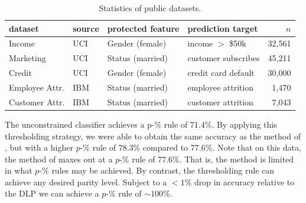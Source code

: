 \begin{table}
\centering
\caption{Statistics of public datasets.\label{tab:datastats}}
\footnotesize 
\begin{tabular}{llllr}
\toprule
\textbf{dataset} & \textbf{source} & \textbf{protected feature} & \textbf{prediction target} & $n$ \\
\midrule
Income & UCI \citep{uci_income} & Gender (female) & income $>$ \$50k & 32,561\\
Marketing & UCI \citep{uci_marketing} & Status (married) & customer subscribes & 45,211\\
Credit & UCI \citep{uci_default} & Gender (female) & credit card default & 30,000\\
Employee Attr. & IBM \citep{ibm_data} & Status (married) & employee attrition & 1,470\\
Customer Attr. & IBM \citep{ibm_data} & Status (married) & customer attrition & 7,043\\
\bottomrule
\end{tabular}
\normalsize
\end{table}

The unconstrained classifier achieves a p-\% rule of 71.4\%.  By applying this thresholding strategy, 
we were able to obtain the same accuracy 
as the method of \cite{zafar2017fairness}, 
but with a higher $p$-\% rule of 78.3\% compared to 77.6\%.  Note that on this data, the method of \cite{zafar2017fairness} maxes out at a $p$-\% rule of 77.6\%.  That is, the method is limited in what $p$-\% rules may be achieved.  By contrast, the thresholding rule can achieve any desired parity level.  Subject to a $<1\%$ drop in accuracy relative to the DLP we can achieve a $p$-\% rule of $\sim{}100$\%.

